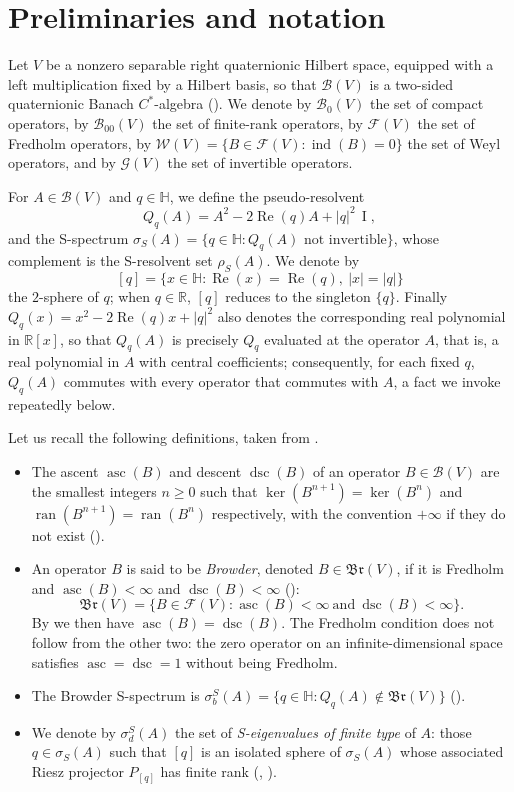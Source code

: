 \documentclass[11pt,a4paper]{article}
\theoremstyle{plain}
\theoremstyle{remark}
\newcommand{\HH}{\mathbb H}
\newcommand{\RR}{\mathbb R}
\newcommand{\V}{V}
\newcommand{\B}{\mathcal B}
\newcommand{\Bo}{\mathcal B_0}
\newcommand{\F}{\mathcal F}
\newcommand{\W}{\mathcal W}
\newcommand{\G}{\mathcal G}
\newcommand{\Br}{\mathfrak{Br}}
\newcommand{\Boo}{\mathcal B_{00}}
\newcommand{\sS}{\sigma_S}
\newcommand{\sigb}{\sigma_b^S}
\newcommand{\sd}{\sigma_d^S}
\newcommand{\rS}{\rho_S}
\DeclareMathOperator{\ran}{ran}
\DeclareMathOperator{\asc}{asc}
\DeclareMathOperator{\dsc}{dsc}
\DeclareMathOperator{\ind}{ind}
\DeclareMathOperator{\Id}{I}
\newcommand{\Qq}[1]{Q_q(#1)}
\begin{document}
\section{Preliminaries and notation}\label{sec:prelim}

Let $\V$ be a nonzero separable right quaternionic Hilbert space, equipped with a left multiplication fixed by a Hilbert basis, so that $\B(\V)$ is a two-sided quaternionic Banach $C^*$-algebra (\cite[Thm~5.1]{MT19}). We denote by $\Bo(\V)$ the set of compact operators, by $\Boo(\V)$ the set of finite-rank operators, by $\F(\V)$ the set of Fredholm operators, by $\W(\V)=\{B\in\F(\V):\ind(B)=0\}$ the set of Weyl operators, and by $\G(\V)$ the set of invertible operators.

For $A\in\B(\V)$ and $q\in\HH$, we define the pseudo-resolvent
\[
\Qq{A}=A^2-2\operatorname{Re}(q)A+|q|^2\,\Id,
\]
and the S-spectrum $\sS(A)=\{q\in\HH:\Qq{A}\text{ not invertible}\}$, whose complement is the S-resolvent set $\rS(A)$. We denote by
\[
[q]=\{x\in\HH:\operatorname{Re}(x)=\operatorname{Re}(q),\ |x|=|q|\}
\]
the $2$-sphere of $q$; when $q\in\RR$, $[q]$ reduces to the singleton $\{q\}$. Finally $Q_q(x)=x^2-2\operatorname{Re}(q)x+|q|^2$ also denotes the corresponding real polynomial in $\RR[x]$, so that $\Qq{A}$ is precisely $Q_q$ evaluated at the operator $A$, that is, a real polynomial in $A$ with central coefficients; consequently, for each fixed $q$, $\Qq{A}$ commutes with every operator that commutes with $A$, a fact we invoke repeatedly below.

Let us recall the following definitions, taken from \cite{MT19}.
\begin{itemize}
\item The ascent $\asc(B)$ and descent $\dsc(B)$ of an operator $B\in\B(\V)$ are the smallest integers $n\ge0$ such that $\ker(B^{n+1})=\ker(B^n)$ and $\ran(B^{n+1})=\ran(B^n)$ respectively, with the convention $+\infty$ if they do not exist (\cite[Def.~7.2]{MT19}).
\item An operator $B$ is said to be \emph{Browder}, denoted $B\in\Br(\V)$, if it is Fredholm and $\asc(B)<\infty$ and $\dsc(B)<\infty$ (\cite[Def.~7.5]{MT19}):
\[
\Br(\V)=\{B\in\F(\V):\asc(B)<\infty\ \text{and}\ \dsc(B)<\infty\}.
\]
By \cite[Lemma~7.3(b)]{MT19} we then have $\asc(B)=\dsc(B)$. The Fredholm condition does not follow from the other two: the zero operator on an infinite-dimensional space satisfies $\asc=\dsc=1$ without being Fredholm.
\item The Browder S-spectrum is $\sigb(A)=\{q\in\HH:\Qq{A}\notin\Br(\V)\}$ (\cite[Def.~7.12]{MT19}).
\item We denote by $\sd(A)$ the set of \emph{S-eigenvalues of finite type} of $A$: those $q\in\sS(A)$ such that $[q]$ is an isolated sphere of $\sS(A)$ whose associated Riesz projector $P_{[q]}$ has finite rank (\cite[Def.~3.2, Thm~3.5]{BJZ24}, \cite[Thm~3.10]{BBJ22}).
\end{itemize}
\end{document}

